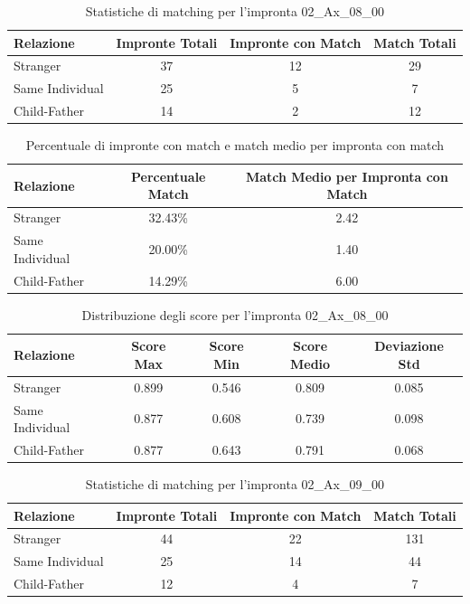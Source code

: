 \begin{table}[htbp]
\centering
\caption{Statistiche di matching per l'impronta 02\_Ax\_08\_00}
\label{tab:results_02_Ax_08_00}
\begin{tabular}{|l|c|c|c|}
\hline
\textbf{Relazione} & \textbf{Impronte Totali} & \textbf{Impronte con Match} & \textbf{Match Totali} \\
\hline
Stranger & 37 & 12 & 29 \\
\hline
Same Individual & 25 & 5 & 7 \\
\hline
Child-Father & 14 & 2 & 12 \\
\hline
\end{tabular}
\end{table}


\begin{table}[htbp]
\centering
\caption{Percentuale di impronte con match e match medio per impronta con match}
\label{tab:match_percentage_02_Ax_08_00}
\begin{tabular}{|l|c|c|}
\hline
\textbf{Relazione} & \textbf{Percentuale Match} & \textbf{Match Medio per Impronta con Match} \\
\hline
Stranger & 32.43\% & 2.42 \\
\hline
Same Individual & 20.00\% & 1.40 \\
\hline
Child-Father & 14.29\% & 6.00 \\
\hline
\end{tabular}
\end{table}


\begin{table}[htbp]
\centering
\caption{Distribuzione degli score per l'impronta 02\_Ax\_08\_00}
\label{tab:scores_02_Ax_08_00}
\begin{tabular}{|l|c|c|c|c|}
\hline
\textbf{Relazione} & \textbf{Score Max} & \textbf{Score Min} & \textbf{Score Medio} & \textbf{Deviazione Std} \\
\hline
Stranger & 0.899 & 0.546 & 0.809 & 0.085 \\
\hline
Same Individual & 0.877 & 0.608 & 0.739 & 0.098 \\
\hline
Child-Father & 0.877 & 0.643 & 0.791 & 0.068 \\
\hline
\end{tabular}
\end{table}


\begin{table}[htbp]
\centering
\caption{Statistiche di matching per l'impronta 02\_Ax\_09\_00}
\label{tab:results_02_Ax_09_00}
\begin{tabular}{|l|c|c|c|}
\hline
\textbf{Relazione} & \textbf{Impronte Totali} & \textbf{Impronte con Match} & \textbf{Match Totali} \\
\hline
Stranger & 44 & 22 & 131 \\
\hline
Same Individual & 25 & 14 & 44 \\
\hline
Child-Father & 12 & 4 & 7 \\
\hline
\end{tabular}
\end{table}


